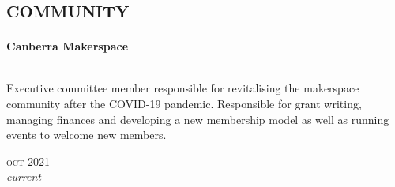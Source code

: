 
\section*{\textsc{community}}
\vspace{-0.2cm}

\begin{minipage}[t]{\mainboxwidth\textwidth}
\textbf{Canberra Makerspace}\\
\\
{\small
Executive committee member responsible for revitalising the makerspace community after the COVID-19 pandemic. Responsible for grant writing, managing finances and developing a new membership model as well as running events to welcome new members.
\par}
\end{minipage}
\begin{minipage}[t]{\detailboxwidth\textwidth}
{
\hfill \textsc{oct} 2021--\\ 
\hspace*{0pt} \hfill \textit{\small current}
\par
}
\end{minipage}
\\


